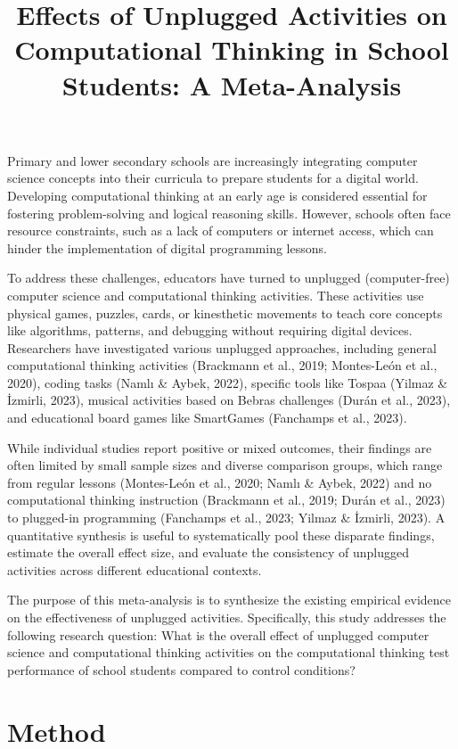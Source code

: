 \documentclass[man,a4paper,12pt,floatsintext,nolmodern,notab]{apa7}
\title{Effects of Unplugged Activities on Computational Thinking in School Students: A Meta-Analysis}
\begin{document}
\maketitle
Primary and lower secondary schools are increasingly integrating computer science concepts into their curricula to prepare students for a digital world. Developing computational thinking at an early age is considered essential for fostering problem-solving and logical reasoning skills. However, schools often face resource constraints, such as a lack of computers or internet access, which can hinder the implementation of digital programming lessons.

To address these challenges, educators have turned to unplugged (computer-free) computer science and computational thinking activities. These activities use physical games, puzzles, cards, or kinesthetic movements to teach core concepts like algorithms, patterns, and debugging without requiring digital devices. Researchers have investigated various unplugged approaches, including general computational thinking activities (Brackmann et al., 2019; Montes-León et al., 2020), coding tasks (Namlı \& Aybek, 2022), specific tools like Tospaa (Yilmaz \& İzmirli, 2023), musical activities based on Bebras challenges (Durán et al., 2023), and educational board games like SmartGames (Fanchamps et al., 2023).

While individual studies report positive or mixed outcomes, their findings are often limited by small sample sizes and diverse comparison groups, which range from regular lessons (Montes-León et al., 2020; Namlı \& Aybek, 2022) and no computational thinking instruction (Brackmann et al., 2019; Durán et al., 2023) to plugged-in programming (Fanchamps et al., 2023; Yilmaz \& İzmirli, 2023). A quantitative synthesis is useful to systematically pool these disparate findings, estimate the overall effect size, and evaluate the consistency of unplugged activities across different educational contexts.

The purpose of this meta-analysis is to synthesize the existing empirical evidence on the effectiveness of unplugged activities. Specifically, this study addresses the following research question: What is the overall effect of unplugged computer science and computational thinking activities on the computational thinking test performance of school students compared to control conditions?

\section{Method}
\end{document}
